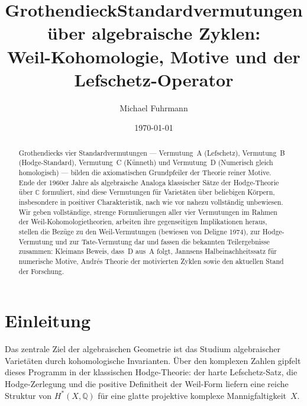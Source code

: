 \documentclass[12pt,a4paper]{amsart}
\theoremstyle{definition}
\newcommand{\Q}{\mathbb{Q}}
\begin{document}

\title{Grothendieck\textquoterightsche Standardvermutungen \"{u}ber algebraische Zyklen:\\
       Weil-Kohomologie, Motive und der Lefschetz-Operator}

\author{Michael Fuhrmann}
\address{Specialist Mathematics Project, Build 170}
\date{\today}

\begin{abstract}
Grothendiecks vier Standardvermutungen --- Vermutung~A (Lefschetz),
Vermutung~B (Hodge-Standard), Vermutung~C (K\"unneth) und Vermutung~D
(Numerisch gleich homologisch) --- bilden die axiomatischen Grundpfeiler
der Theorie reiner Motive.  Ende der 1960er Jahre als algebraische Analoga
klassischer Sätze der Hodge-Theorie über $\mathbb{C}$ formuliert, sind diese
Vermutungen für Varietäten über beliebigen Körpern, insbesondere in positiver
Charakteristik, nach wie vor nahezu vollständig unbewiesen.  Wir geben
vollständige, strenge Formulierungen aller vier Vermutungen im Rahmen
der Weil-Kohomologietheorien, arbeiten ihre gegenseitigen Implikationen heraus,
stellen die Bezüge zu den Weil-Vermutungen (bewiesen von Deligne 1974),
zur Hodge-Vermutung und zur Tate-Vermutung dar und fassen die bekannten
Teilergebnisse zusammen: Kleimans Beweis, dass~D aus~A folgt, Jannsens
Halbeinachheitssatz für numerische Motive, Andrés Theorie der motivierten Zyklen
sowie den aktuellen Stand der Forschung.
\end{abstract}

\maketitle

\tableofcontents

\section{Einleitung}

Das zentrale Ziel der algebraischen Geometrie ist das Studium algebraischer
Varietäten durch kohomologische Invarianten.  Über den komplexen Zahlen
gipfelt dieses Programm in der klassischen Hodge-Theorie: der harte
Lefschetz-Satz, die Hodge-Zerlegung und die positive Definitheit der
Weil-Form liefern eine reiche Struktur von $H^*(X,\Q)$ für eine glatte
projektive komplexe Mannigfaltigkeit~$X$.
\end{document}

